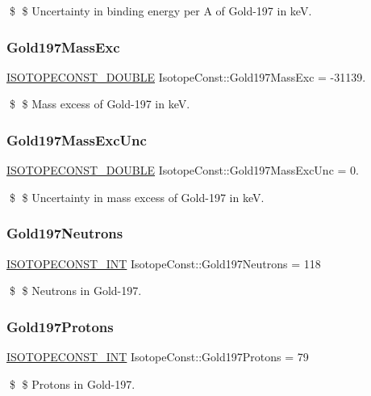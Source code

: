 \$ \$ Uncertainty in binding energy per A of Gold-\/197 in keV. \mbox{\label{group___isotope_const-_gold-_au197_ga36a1898dbc493eb53e4b981f0ba3bd48}} 
\subsubsection{\texorpdfstring{Gold197\+Mass\+Exc}{Gold197MassExc}}
{\footnotesize\ttfamily \mbox{\hyperlink{group___isotope_const-_macros_ga8f45a7272ce02c0b4c65c44636ed719a}{I\+S\+O\+T\+O\+P\+E\+C\+O\+N\+S\+T\+\_\+\+D\+O\+U\+B\+LE}} Isotope\+Const\+::\+Gold197\+Mass\+Exc = -\/31139.}

\$ \$ Mass excess of Gold-\/197 in keV. \mbox{\label{group___isotope_const-_gold-_au197_ga3b95b274edfe54910a708dfb8eecd5f8}} 
\subsubsection{\texorpdfstring{Gold197\+Mass\+Exc\+Unc}{Gold197MassExcUnc}}
{\footnotesize\ttfamily \mbox{\hyperlink{group___isotope_const-_macros_ga8f45a7272ce02c0b4c65c44636ed719a}{I\+S\+O\+T\+O\+P\+E\+C\+O\+N\+S\+T\+\_\+\+D\+O\+U\+B\+LE}} Isotope\+Const\+::\+Gold197\+Mass\+Exc\+Unc = 0.}

\$ \$ Uncertainty in mass excess of Gold-\/197 in keV. \mbox{\label{group___isotope_const-_gold-_au197_ga21672fbbe726ec6f11d22a5efcf3e4a9}} 
\subsubsection{\texorpdfstring{Gold197\+Neutrons}{Gold197Neutrons}}
{\footnotesize\ttfamily \mbox{\hyperlink{group___isotope_const-_macros_ga5f18360b3e99483a35c32d789e62621c}{I\+S\+O\+T\+O\+P\+E\+C\+O\+N\+S\+T\+\_\+\+I\+NT}} Isotope\+Const\+::\+Gold197\+Neutrons = 118}

\$ \$ Neutrons in Gold-\/197. \mbox{\label{group___isotope_const-_gold-_au197_ga234c313fb0f9e58211c146f256f882d2}} 
\subsubsection{\texorpdfstring{Gold197\+Protons}{Gold197Protons}}
{\footnotesize\ttfamily \mbox{\hyperlink{group___isotope_const-_macros_ga5f18360b3e99483a35c32d789e62621c}{I\+S\+O\+T\+O\+P\+E\+C\+O\+N\+S\+T\+\_\+\+I\+NT}} Isotope\+Const\+::\+Gold197\+Protons = 79}

\$ \$ Protons in Gold-\/197. 